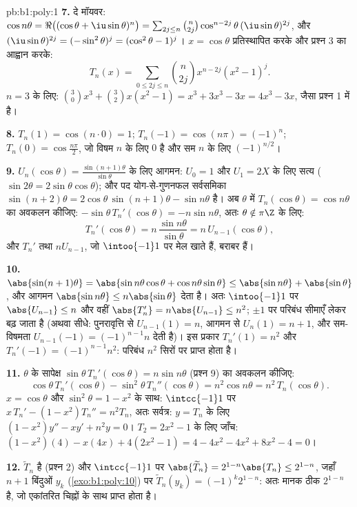 \begin{solution}{pb:b1:poly:1}
\textbf{7.} दे मॉयवर: $\cos n\theta = \Re\bigl((\cos\theta +
\iu\sin\theta)^n\bigr) = \sum_{2j \leq n}\binom n{2j}
\cos^{n-2j}\theta\,(\iu\sin\theta)^{2j}$, और $(\iu\sin\theta)^{2j} =
(-\sin^2\theta)^j = (\cos^2\theta - 1)^j$। $x = \cos\theta$ प्रतिस्थापित
करके और प्रश्न 3 का आह्वान करके:
\[
T_n(x) = \sum_{0\leq 2j\leq n}\binom n{2j}x^{n-2j}(x^2 - 1)^j .
\]
$n = 3$ के लिए: $\binom30 x^3 + \binom32 x(x^2 - 1) = x^3 + 3x^3 - 3x = 4x^3
- 3x$, जैसा प्रश्न 1 में है।

\textbf{8.} $T_n(1) = \cos(n\cdot0) = 1$; $T_n(-1) = \cos(n\pi) = (-1)^n$;
$T_n(0) = \cos\frac{n\pi}2$, जो विषम $n$ के लिए $0$ है और सम $n$ के लिए
$(-1)^{n/2}$।

\textbf{9.} $U_n(\cos\theta) = \frac{\sin(n+1)\theta}{\sin\theta}$ के लिए
आगमन: $U_0 = 1$ और $U_1 = 2X$ के लिए सत्य ($\sin2\theta =
2\sin\theta\cos\theta$); और पद योग-से-गुणनफल सर्वसमिका $\sin(n+2)\theta =
2\cos\theta\, \sin(n+1)\theta - \sin n\theta$ है। अब $\theta$ में
$T_n(\cos\theta) = \cos n\theta$ का अवकलन कीजिए:
$-\sin\theta\,T_n'(\cos\theta) = -n\sin n\theta$, अतः $\theta \notin \pi\Z$
के लिए:
\[
T_n'(\cos\theta) = n\,\frac{\sin n\theta}{\sin\theta}
= n\,U_{n-1}(\cos\theta) ,
\]
और  $T_n'$ तथा $nU_{n-1}$, जो $\intoo{-1}1$ पर मेल खाते हैं, बराबर हैं।

\textbf{10.} $\abs{\sin(n+1)\theta} = \abs{\sin n\theta\cos\theta + \cos
n\theta\sin\theta} \leq \abs{\sin n\theta} + \abs{\sin\theta}$, और आगमन
$\abs{\sin n\theta} \leq n\abs{\sin\theta}$ देता है। अतः $\intoo{-1}1$ पर
$\abs{U_{n-1}} \leq n$ और वहीं $\abs{T_n'} = n\abs{U_{n-1}} \leq n^2$;
$\pm1$ पर परिबंध सीमाएँ लेकर बढ़ जाता है (अथवा सीधे: पुनरावृत्ति से
$U_{n-1}(1) = n$, आगमन से $U_n(1) = n + 1$, और सम-विषमता $U_{n-1}(-1) =
(-1)^{n-1}n$ देती है)। इस प्रकार $T_n'(1) = n^2$ और $T_n'(-1) =
(-1)^{n-1}n^2$: परिबंध $n^2$ सिरों पर प्राप्त होता है।

\textbf{11.} $\theta$ के सापेक्ष $\sin\theta\,T_n'(\cos\theta) = n\sin
n\theta$ (प्रश्न 9) का अवकलन कीजिए:
\[
\cos\theta\,T_n'(\cos\theta) - \sin^2\theta\,T_n''(\cos\theta)
= n^2\cos n\theta = n^2\,T_n(\cos\theta) .
\]
$x = \cos\theta$ और $\sin^2\theta = 1 - x^2$ के साथ: $\intcc{-1}1$ पर
$x\,T_n' - (1 - x^2)T_n'' = n^2T_n$, अतः सर्वत्र: $y = T_n$ के लिए $(1 -
x^2)y'' - xy' + n^2y = 0$। $T_2 = 2x^2 - 1$ के लिए जाँच: $(1 - x^2)(4) -
x(4x) + 4(2x^2 - 1) = 4 - 4x^2 - 4x^2 + 8x^2 - 4 = 0$।

\textbf{12.} $\widetilde T_n$  है (प्रश्न 2) और $\intcc{-1}1$ पर
$\abs{\widetilde T_n} = 2^{1-n}\abs{T_n} \leq 2^{1-n}$, जहाँ $n + 1$ बिंदुओं
$y_k$ (\cref{exo:b1:poly:10}) पर $\widetilde T_n(y_k) = (-1)^k2^{1-n}$: अतः
मानक ठीक $2^{1-n}$ है, जो एकांतरित चिह्नों के साथ प्राप्त होता है।


\end{solution}
